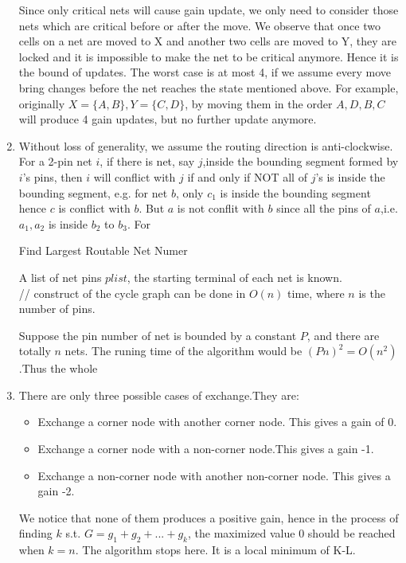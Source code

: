 \documentclass[a4paper,12pt]{article}
\begin{document}
\begin{enumerate}
Since only critical nets will cause gain update, 
we only need to consider those nets which are critical before or after the move.
We observe that once two cells on a net are moved to X and another two cells are moved to Y,
they are locked and it is impossible to make the net to be critical anymore.
Hence it is the bound of updates. The worst case is at most 4, 
if we assume every move bring changes before the net reaches the state mentioned above.
For example, originally $X=\{A,B\},Y=\{C,D\}$, by moving them in the order $A,D,B,C$ will produce 4 gain updates, 
but no further update anymore.
\item
Without loss of generality, we assume the routing direction is anti-clockwise.
For a 2-pin net $i$, if there is net, say $j$,inside the bounding segment formed by $i$'s pins, 
then $i$ will conflict with $j$ if and only if NOT all of $j$'s is inside the bounding segment,
e.g. for net $b$, only $c_1$ is inside the bounding segment hence $c$ is conflict with $b$.
But $a$ is not conflit with $b$ since all the pins of $a$,i.e. $a_1,a_2$ is inside $b_2$ to $b_3$.
For 
\begin{algorithm}[htbp!]
\caption{Find Largest Routable Net Numer}
\begin{algorithmic}[1]
\REQUIRE A list of net pins $plist$, the starting terminal of each net is known.\\
\STATE // construct of the cycle graph can be done in $O(n)$ time, where $n$ is the number of pins.
\RETURN 
\end{algorithmic}
\end{algorithm}
Suppose the pin number of net is bounded by a constant $P$, and there are totally $n$ nets.
The runing time of the algorithm would be $(Pn)^2=O(n^2)$.Thus the whole
\item
There are only three possible cases of exchange.They are:
\begin{itemize}
\item
Exchange a corner node with another corner node. This gives a gain of 0.
\item
Exchange a corner node with a non-corner node.This gives a gain -1.
\item
Exchange a non-corner node with another non-corner node. This gives a gain -2.
\end{itemize}
We notice that none of them produces a positive gain, 
hence in the process of finding $k$ s.t. $G=g_1+g_2+...+g_k$, the maximized value 0 should be reached when $k=n$.
The algorithm stops here. It is a local minimum of K-L.
\end{enumerate}
\end{document}
